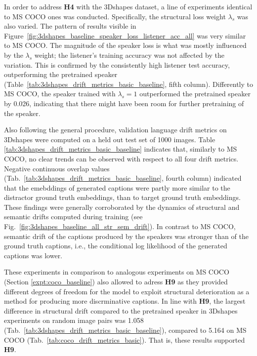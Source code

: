 In order to address \textbf{H4} with the 3Dshapes dataset, a line of experiments identical to MS COCO ones was conducted. Specifically, the structural loss weight $\lambda_s$ was also varied. The pattern of results visible in Figure~\ref{fig:3dshapes_baseline_speaker_loss_listener_acc_all} was very similar to MS COCO. The magnitude of the speaker loss is what was mostly influenced by the $\lambda_s$ weight; the listener's training accuracy was not affected by the variation. This is confirmed by the consistently high listener test accuracy, outperforming the pretrained speaker (Table~\ref{tab:3dshapes_drift_metrics_basic_baseline}, fifth column). Differently to MS COCO, the speaker trained with $\lambda_s = 1$ outperformed the pretrained speaker by 0.026, indicating that there might have been room for further pretraining of the speaker. 

Also following the general procedure, validation language drift metrics on 3Dshapes were computed on a held out test set of 1000 images. Table \ref{tab:3dshapes_drift_metrics_basic_baseline} indicates that, similarly to MS COCO, no clear trends can be observed with respect to all four drift metrics. Negative continuous overlap values (Tab.~\ref{tab:3dshapes_drift_metrics_basic_baseline}, fourth column) indicated that the emebddings of generated captions were partly more similar to the distractor ground truth embeddings, than to target ground truth embeddings. These findings were generally corroborated by the dynamics of structural and semantic drifts computed during training (see Fig.~\ref{fig:3dshapes_baseline_all_str_sem_drift}). In contrast to MS COCO, semantic drift of the captions produced by the speakers was stronger than of the ground truth captions, i.e., the conditional log likelihood of the generated captions was lower. 

These experiments in comparison to analogous experiments on MS COCO (Section \ref{expt:coco_baseline}) also allowed to adress \textbf{H9} as they provided different degrees of freedom for the model to exploit structural deterioration as a method for producing more discrminative captions. In line with \textbf{H9}, the largest difference in structural drift compared to the pretrained speaker in 3Dshapes experiments on random image pairs was 1.058 (Tab.~\ref{tab:3dshapes_drift_metrics_basic_baseline}), compared to 5.164 on MS COCO (Tab.~\ref{tab:coco_drift_metrics_basic}). That is, these results supported \textbf{H9}.

